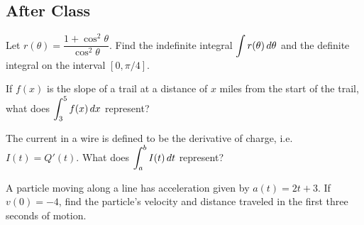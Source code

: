 \documentclass[notes]{subfiles}
\begin{document}
	\subsection*{After Class}
		\begin{ex}
			Let $r(\theta) = \dfrac{1+\cos^2\theta}{\cos^2\theta}$.  Find the indefinite integral $\displaystyle \int r(\theta)\, d\theta$ and the definite integral on the interval $[0,\pi/4]$.
		\end{ex}
			
		\begin{ex}
			If $f(x)$ is the slope of a trail at a distance of $x$ miles from the start of the trail, what does $\displaystyle \int_3^5 f(x)\, dx$ represent?
		\end{ex}
			
		\begin{ex}
			The current in a wire is defined to be the derivative of charge, i.e. $I(t) = Q'(t)$.  What does $\displaystyle \int_a^b I(t)\, dt$ represent?
		\end{ex}
			
		\begin{ex}
			A particle moving along a line has acceleration given by $a(t) = 2t+3$.  If $v(0) = -4$, find the particle's velocity and distance traveled in the first three seconds of motion.
		\end{ex}
			
	\clearpage			
\end{document}

